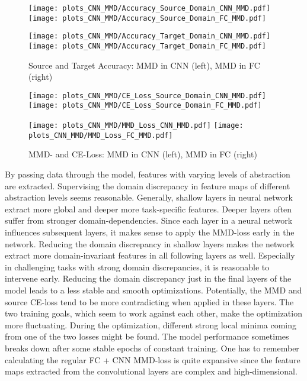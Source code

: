 \begin{figure}[htp]
  \centering
  \texttt{[image: plots\_CNN\_MMD/Accuracy\_Source\_Domain\_CNN\_MMD.pdf]}
  \hspace{.3cm}
  \texttt{[image: plots\_CNN\_MMD/Accuracy\_Source\_Domain\_FC\_MMD.pdf]}

  \vspace{.1cm}

  \texttt{[image: plots\_CNN\_MMD/Accuracy\_Target\_Domain\_CNN\_MMD.pdf]}
  \hspace{.3cm}
  \texttt{[image: plots\_CNN\_MMD/Accuracy\_Target\_Domain\_FC\_MMD.pdf]}

  \caption{Source and Target Accuracy: MMD in CNN (left), MMD in FC (right)}
  \label{fig:accuracy_cnn_and_no_cnn_mmd}
\end{figure}

\begin{figure}[H]
  \centering
  \texttt{[image: plots\_CNN\_MMD/CE\_Loss\_Source\_Domain\_CNN\_MMD.pdf]}
  \hspace{.3cm}
  \texttt{[image: plots\_CNN\_MMD/CE\_Loss\_Source\_Domain\_FC\_MMD.pdf]}

  \vspace{.1cm}

  \texttt{[image: plots\_CNN\_MMD/MMD\_Loss\_CNN\_MMD.pdf]}
  \hspace{.1cm}
  \texttt{[image: plots\_CNN\_MMD/MMD\_Loss\_FC\_MMD.pdf]}

  \caption{MMD- and CE-Loss: MMD in CNN (left), MMD in FC (right)}
  \label{fig:loss_cnn_and_no_cnn_mmd}
\end{figure}

By passing data through the model, features with varying levels of abstraction are extracted. Supervising the domain discrepancy in feature maps of different abstraction levels seems reasonable. Generally, shallow layers in neural network extract more global and deeper more task-specific features. Deeper layers often suffer from stronger domain-dependencies. Since each layer in a neural network influences subsequent layers, it makes sense to apply the MMD-loss early in the network. Reducing the domain discrepancy in shallow layers makes the network extract more domain-invariant features in all following layers as well. Especially in challenging tasks with strong domain discrepancies, it is reasonable to intervene early. Reducing the domain discrepancy just in the final layers of the model leads to a less stable and smooth optimizations. Potentially, the MMD and source CE-loss tend to be more contradicting when applied in these layers. The two training goals, which seem to work against each other, make the optimization more fluctuating. During the optimization, different strong local minima coming from one of the two losses might be found. The model performance sometimes breaks down after some stable epochs of constant training. One has to remember calculating the regular FC + CNN MMD-loss is quite expansive since the feature maps extracted from the convolutional layers are complex and high-dimensional.



